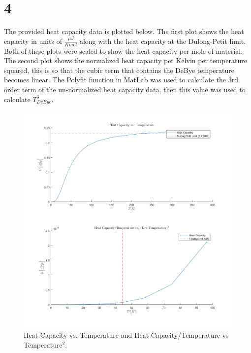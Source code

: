 \section*{4}
The provided heat capacity data is plotted below. The first plot shows the heat capacity in units of $\frac{\mu J}{K mol}$ along with the heat capacity at the Dulong-Petit limit. Both of these plots were scaled to show the heat capacity per mole of material. The second plot shows the normalized heat capacity per Kelvin per temperature squared, this is so that the cubic term that contains the DeBye temperature becomes linear. The Polyfit function in MatLab was used to calculate the 3rd order term of the un-normalized heat capacity data, then this value was used to calculate $T_{DeBye}^3$.
\begin{figure}[h]
    \centering
    \includegraphics[width=1\linewidth]{Resources//140A//Homework 1/140A Homework 1 Problem 4.png.png}
    \caption{Heat Capacity vs. Temperature and Heat Capacity/Temperature vs Temperature$^2$.}
    \label{fig:enter-label}
\end{figure}
